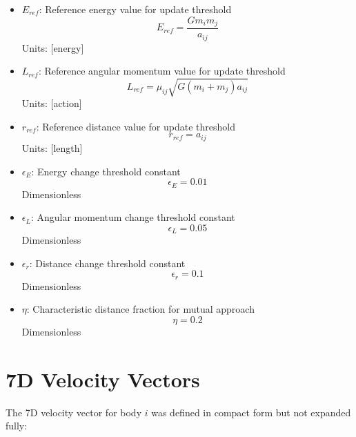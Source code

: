 \documentclass{article}
\begin{document}
\begin{itemize}
\item $E_{ref}$: Reference energy value for update threshold
    \begin{equation}
    E_{ref} = \frac{G m_i m_j}{a_{ij}}
    \end{equation}
    Units: [energy]
    
\item $L_{ref}$: Reference angular momentum value for update threshold
    \begin{equation}
    L_{ref} = \mu_{ij}\sqrt{G(m_i+m_j)a_{ij}}
    \end{equation}
    Units: [action]
    
\item $r_{ref}$: Reference distance value for update threshold
    \begin{equation}
    r_{ref} = a_{ij}
    \end{equation}
    Units: [length]
    
\item $\epsilon_E$: Energy change threshold constant
    \begin{equation}
    \epsilon_E = 0.01
    \end{equation}
    Dimensionless
    
\item $\epsilon_L$: Angular momentum change threshold constant
    \begin{equation}
    \epsilon_L = 0.05
    \end{equation}
    Dimensionless
    
\item $\epsilon_r$: Distance change threshold constant
    \begin{equation}
    \epsilon_r = 0.1
    \end{equation}
    Dimensionless
    
\item $\eta$: Characteristic distance fraction for mutual approach
    \begin{equation}
    \eta = 0.2
    \end{equation}
    Dimensionless
\end{itemize}

\section{7D Velocity Vectors}

The 7D velocity vector for body $i$ was defined in compact form but not expanded fully:
\end{document}
